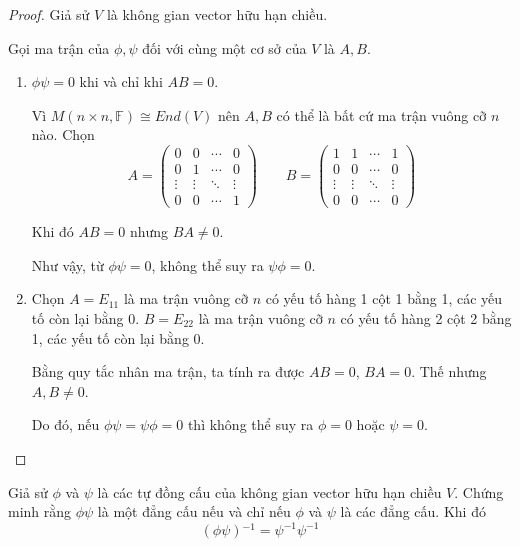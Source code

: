 \documentclass[class=linearalgebra,crop=false]{standalone}
\begin{document}
\begin{proof}
    Giả sử $V$ là không gian vector hữu hạn chiều.
    \par Gọi ma trận của $\phi, \psi$ đối với cùng một cơ sở của $V$ là $A, B$.
    \begin{enumerate}[label = (\alph*)]
        \item $\phi\psi = 0$ khi và chỉ khi $AB = 0$.
              \par Vì $M(n\times n,\mathbb{F})\cong End(V)$ nên $A, B$ có thể là bất cứ ma trận vuông cỡ $n$ nào. Chọn
              \[
                  A =
                  \begin{pmatrix}
                      0      & 0      & \cdots & 0      \\
                      0      & 1      & \cdots & 0      \\
                      \vdots & \vdots & \ddots & \vdots \\
                      0      & 0      & \cdots & 1
                  \end{pmatrix}\qquad
                  B =
                  \begin{pmatrix}
                      1      & 1      & \cdots & 1      \\
                      0      & 0      & \cdots & 0      \\
                      \vdots & \vdots & \ddots & \vdots \\
                      0      & 0      & \cdots & 0
                  \end{pmatrix}
              \]
              \par Khi đó $AB = 0$ nhưng $BA\ne 0$.
              \par Như vậy, từ $\phi\psi = 0$, không thể suy ra $\psi\phi = 0$.
        \item Chọn $A = E_{11}$ là ma trận vuông cỡ $n$ có yếu tố hàng 1 cột 1 bằng 1, các yếu tố còn lại bằng 0. $B = E_{22}$ là ma trận vuông cỡ $n$ có yếu tố hàng 2 cột 2 bằng 1, các yếu tố còn lại bằng 0.
              \par Bằng quy tắc nhân ma trận, ta tính ra được $AB = 0$, $BA = 0$. Thế nhưng $A, B\ne 0$.
              \par Do đó, nếu $\phi\psi = \psi\phi = 0$ thì không thể suy ra $\phi = 0$ hoặc $\psi = 0$.
    \end{enumerate}
\end{proof}

\begin{exercise}
    Giả sử $\phi$ và $\psi$ là các tự đồng cấu của không gian vector hữu hạn chiều $V$. Chứng minh rằng $\phi\psi$ là một đẳng cấu nếu và chỉ nếu $\phi$ và $\psi$ là các đẳng cấu. Khi đó
    \[
        (\phi\psi){}^{-1} = \psi^{-1}\psi^{-1}
    \]
\end{exercise}
\end{document}
